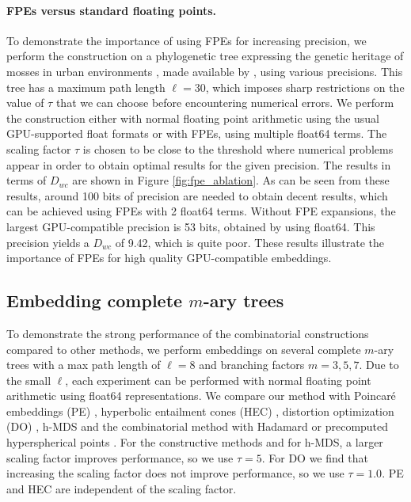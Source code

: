 



\vspace{-0.1cm}

\paragraph{FPEs versus standard floating points.}
To demonstrate the importance of using FPEs for increasing precision, we perform the construction on a phylogenetic tree expressing the genetic heritage of mosses in urban environments \citep{hofbauer2016preliminary}, made available by \mbox{\citep{sanderson1994treebase}}, using various precisions. This tree has a maximum path length $\ell = 30$, which imposes sharp restrictions on the value of $\tau$ that we can choose before encountering numerical errors. We perform the construction either with normal floating point arithmetic using the usual GPU-supported float formats or with FPEs, using multiple float64 terms. The scaling factor $\tau$ is chosen to be close to the threshold where numerical problems appear in order to obtain optimal results for the given precision.
The results in terms of $D_{wc}$ are shown in Figure \ref{fig:fpe_ablation}. As can be seen from these results, around 100 bits of precision are needed to obtain decent results, which can be achieved using FPEs with 2 float64 terms. Without FPE expansions, the largest GPU-compatible precision is 53 bits, obtained by using float64. This precision yields a $D_{wc}$ of 9.42, which is quite poor. These results illustrate the importance of FPEs for high quality GPU-compatible embeddings.
\vspace{-0.1cm}

\subsection{Embedding complete \texorpdfstring{$m$}{m}-ary trees}
\vspace{-0.2cm}
To demonstrate the strong performance of the combinatorial constructions compared to other methods, we perform embeddings on several complete $m$-ary trees with a max path length of $\ell = 8$ and branching factors $m = 3, 5, 7$. Due to the small $\ell$, each experiment can be performed with normal floating point arithmetic using float64 representations. We compare our method with Poincaré embeddings (PE) \citep{nickel2017poincare}, hyperbolic entailment cones (HEC) \citep{ganea2018hyperbolic}, distortion optimization (DO) \citep{sala2018representation,yu2022skin}, h-MDS \citep{sala2018representation} and the combinatorial method with Hadamard \citep{sala2018representation} or precomputed hyperspherical points \citep{lovisolo2001uniform}. For the constructive methods and for h-MDS, a larger scaling factor improves performance, so we use $\tau = 5$. For DO we find that increasing the scaling factor does not improve performance, so we use $\tau = 1.0$. PE and HEC are independent of the scaling factor.


